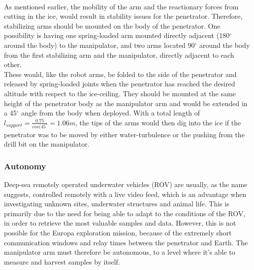 \\
As mentioned earlier, the mobility of the arm and the reactionary forces from cutting in the ice, would result in stability issues for the penetrator. Therefore, stabilizing arms should be mounted on the body of the penetrator. One possibility is having one spring-loaded arm mounted directly adjacent (180$^\circ$ around the body) to the manipulator, and two arms located 90$^\circ$ around the body from the first stabilizing arm and the manipulator, directly adjacent to each other.\\
These would, like the robot arms, be folded to the side of the penetrator and released by spring-loaded joints when the penetrator has reached the desired altitude with respect to the ice-ceiling. They should be mounted at the same height of the penetrator body as the manipulator arm and would be extended in a 45$^\circ$ angle from the body when deployed. With a total length of $l_{support}=\frac{0.75}{cos(45^\circ}=1.06m$, the tips of the arms would then dig into the ice if the penetrator was to be moved by either water-turbulence or the pushing from the drill bit on the manipulator.


\subsubsection{Autonomy}
Deep-sea remotely operated underwater vehicles (ROV) are usually, as the name suggests, controlled remotely with a live video feed, which is an advantage when investigating unknown sites, underwater structures and animal life. This is primarily due to the need for being able to adapt to the conditions of the ROV, in order to retrieve the most valuable samples and data. However, this is not possible for the Europa exploration mission, because of the extremely short communication windows and relay times between the penetrator and Earth. The manipulator arm must therefore be autonomous, to a level where it's able to measure and harvest samples by itself. 



